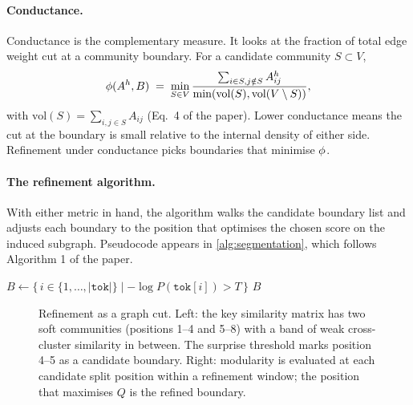 \paragraph{Conductance.}
Conductance is the complementary measure. It looks at the fraction of total edge weight cut at a community boundary. For a candidate community $S \subset V$,
\begin{equation}
  \phi(A^h, B) \;=\; \min_{S \in V} \frac{\sum_{i \in S, j \notin S} A^h_{ij}}{\min(\mathrm{vol}(S), \mathrm{vol}(V \setminus S))},
  \label{eq:conductance}
\end{equation}
with $\mathrm{vol}(S) = \sum_{i,j \in S} A_{ij}$ (Eq.\ 4 of the paper). Lower conductance means the cut at the boundary is small relative to the internal density of either side. Refinement under conductance picks boundaries that minimise $\phi$.

\paragraph{The refinement algorithm.}
With either metric in hand, the algorithm walks the candidate boundary list and adjusts each boundary to the position that optimises the chosen score on the induced subgraph. Pseudocode appears in \cref{alg:segmentation}, which follows Algorithm 1 of the paper.

\begin{algorithm}[h]
  \DontPrintSemicolon
  $B \gets \{\, i \in \{1, \dots, |\texttt{tok}|\} \mid -\log P(\texttt{tok}[i]) > T \,\}$ 
  \For{$i \gets 1$ \KwTo $|B| - 1$}{
    $\alpha, \beta \gets B[i],\ B[i+1]$\;
    $B[i+1] \gets \arg\max_{\hat{\beta} \in (\alpha, \beta]} f\big(A,\ \{\alpha, \hat{\beta}\}\big)$ \tcp*[r]{shift boundary}
  }
  \Return $B$\;
  \caption{Event segmentation in the KV cache, following Algorithm 1 of \textcite{fountas2025emllm}.}
  \label{alg:segmentation}
\end{algorithm}

\begin{figure}[h]
\centering

\caption{Refinement as a graph cut. Left: the key similarity matrix has two soft communities (positions 1--4 and 5--8) with a band of weak cross-cluster similarity in between. The surprise threshold marks position 4--5 as a candidate boundary. Right: modularity is evaluated at each candidate split position within a refinement window; the position that maximises $Q$ is the refined boundary.}
\label{fig:boundary-refinement}
\end{figure}

